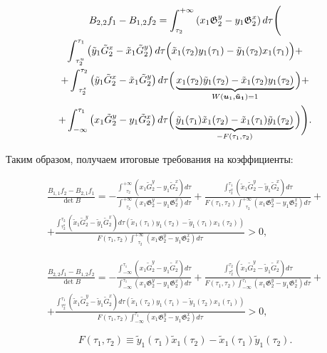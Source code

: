 \begin{multline*}
B_{2,2}f_1 - B_{1,2}f_2 = \int_{\tau_2}^{+\infty} \left( x_1 \mathfrak{G}_2^y - y_1 \mathfrak{G}_2^x \right) d \tau \Bigg(\\
  \int_{\text{ } \tau_2^u}^{\tau_1} \left( \tilde y_1 \tilde{G}_2^x - \tilde x_1 \tilde{G}_2^y \right) d \tau \Big( 
        \tilde x_1(\tau_2) y_1(\tau_1) - \tilde y_1(\tau_2) x_1(\tau_1)
    \Big)+\\
+ \int_{\text{ } \tau_2^s}^{\tau_2} \left( \tilde y_1 \tilde{G}_2^x - \tilde x_1 \tilde{G}_2^y \right) d \tau\Big( 
        \underbrace{x_1(\tau_2) \tilde y_1(\tau_2) - \tilde x_1(\tau_2) y_1(\tau_2)}_{W(\boldsymbol{u}_1, \boldsymbol{\tilde u_1}) = 1}
    \Big)+\\
+ \int_{-\infty}^{\tau_1} \left( x_1 \tilde{G}_2^y - y_1 \tilde{G}_2^x \right) d \tau\Big( 
        \underbrace{\tilde y_1(\tau_1) \tilde x_1(\tau_2) - \tilde x_1(\tau_1) \tilde y_1(\tau_2)}_{-F(\tau_1,\tau_2)}
    \Big)
\Bigg).
\end{multline*}

Таким образом, получаем итоговые требования на коэффициенты:

\begin{multline*}
\frac{B_{1,1}f_2 - B_{2,1}f_1}{\det B} = 
- \frac{\int_{\text{ } \tau_2}^{+\infty} \left( x_1 \tilde{G}_2^y - y_1 \tilde{G}_2^x \right) d \tau}{\int_{\text{ } \tau_2}^{+\infty} \left( x_1 \mathfrak{G}_2^y - y_1 \mathfrak{G}_2^x \right) d \tau} + 
\frac{\int_{\tau_2^u}^{\tau_1} \left( \tilde x_1 \tilde{G}_2^y - \tilde y_1 \tilde{G}_2^x \right) d \tau}{F(\tau_1,\tau_2) \int_{\text{ } \tau_2}^{+\infty} \left( x_1 \mathfrak{G}_2^y - y_1 \mathfrak{G}_2^x \right) d \tau} + \\
+ \frac{\int_{\tau_2^s}^{\tau_2} \left( \tilde x_1 \tilde{G}_2^y - \tilde y_1 \tilde{G}_2^x \right) d \tau \left( \tilde x_1(\tau_1) y_1(\tau_2) - \tilde y_1(\tau_1) x_1(\tau_2) \right)}{F(\tau_1,\tau_2) \int_{\text{ } \tau_2}^{+\infty} \left( x_1 \mathfrak{G}_2^y - y_1 \mathfrak{G}_2^x \right) d \tau} > 0,
\end{multline*}

\begin{multline*}
\frac{B_{2,2}f_1 - B_{1,2}f_2}{\det B} = 
- \frac{\int_{-\infty}^{\tau_1} \left( x_1 \tilde{G}_2^y - y_1 \tilde{G}_2^x \right) d \tau}{\int_{-\infty}^{\tau_1} \left( x_1 \mathfrak{G}_2^y - y_1 \mathfrak{G}_2^x \right) d \tau} + 
\frac{\int_{\tau_2^s}^{\tau_2} \left( \tilde x_1 \tilde{G}_2^y - \tilde y_1 \tilde{G}_2^x \right) d \tau}{F(\tau_1,\tau_2) \int_{-\infty}^{\tau_1} \left( x_1 \mathfrak{G}_2^y - y_1 \mathfrak{G}_2^x \right) d \tau} + \\
+ \frac{\int_{\tau_2^u}^{\tau_1} \left( \tilde x_1 \tilde{G}_2^y - \tilde y_1 \tilde{G}_2^x \right) d \tau \left( \tilde x_1(\tau_2) y_1(\tau_1) - \tilde y_1(\tau_2) x_1(\tau_1) \right)}{F(\tau_1,\tau_2) \int_{-\infty}^{\tau_1} \left( x_1 \mathfrak{G}_2^y - y_1 \mathfrak{G}_2^x \right) d \tau} > 0,
\end{multline*}

$$F(\tau_1,\tau_2) \equiv \tilde y_1(\tau_1) \tilde x_1(\tau_2) - \tilde x_1(\tau_1) \tilde y_1(\tau_2).$$

